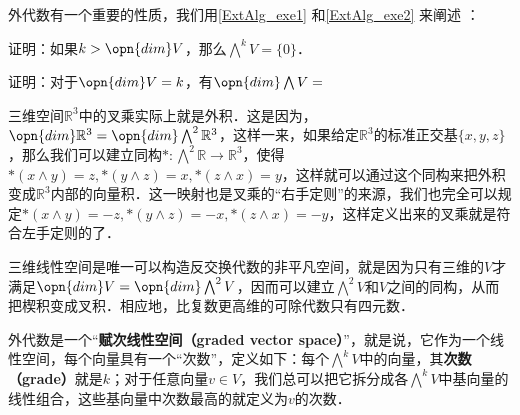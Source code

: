 外代数有一个重要的性质，我们用\autoref{ExtAlg_exe1} 和\autoref{ExtAlg_exe2} 来阐述 ：

\begin{exercise}{}\label{ExtAlg_exe1}
证明：如果$k>\opn{dim} V$，那么$\bigwedge^kV=\{0\}$．
\end{exercise}

\begin{exercise}{}\label{ExtAlg_exe2}
证明：对于$\opn{dim} V=k$，有$\opn{dim} \bigwedge V=$
\end{exercise}




三维空间$\mathbb{R}^3$中的叉乘实际上就是外积．这是因为，$\opn{dim}\mathbb{R}^3=\opn{dim}\bigwedge^2\mathbb{R}^3$，这样一来，如果给定$\mathbb{R}^3$的标准正交基$\{x, y, z\}$，那么我们可以建立同构$*: \bigwedge^2\mathbb{R}\rightarrow\mathbb{R}^3$，使得$*(x\wedge y)=z, *(y\wedge z)=x, *(z\wedge x)=y$，这样就可以通过这个同构来把外积变成$\mathbb{R}^3$内部的向量积．这一映射也是叉乘的“右手定则”的来源，我们也完全可以规定$*(x\wedge y)=-z, *(y\wedge z)=-x, *(z\wedge x)=-y$，这样定义出来的叉乘就是符合左手定则的了．

三维线性空间是唯一可以构造反交换代数的非平凡空间，就是因为只有三维的$V$才满足$\opn{dim}V=\opn{dim}\bigwedge^2V$，因而可以建立$\bigwedge^2 V$和$V$之间的同构，从而把楔积变成叉积．相应地，比复数更高维的可除代数只有四元数．

外代数是一个“\textbf{赋次线性空间（graded vector space）}”，就是说，它作为一个线性空间，每个向量具有一个“次数”，定义如下：每个$\bigwedge^kV$中的向量，其\textbf{次数（grade）}就是$k$；对于任意向量$v\in V$，我们总可以把它拆分成各$\bigwedge^kV$中基向量的线性组合，这些基向量中次数最高的就定义为$v$的次数．
